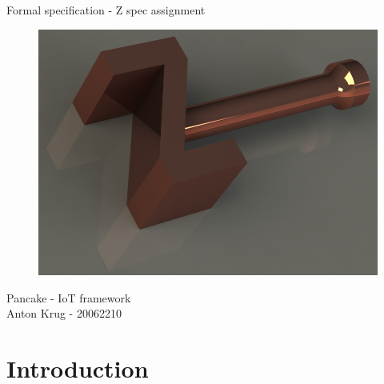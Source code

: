 \documentclass{article}
\begin{document}
\pagestyle{empty}

 
\center
{\Huge Formal specification -  Z spec assignment}

\begin{figure}[h!]
	\includegraphics[width=\textwidth]{images/hammer.png}
    \label{fig:modules}
\end{figure}

{\Huge Pancake - IoT framework }\\

{\huge Anton Krug - 20062210
\vfill
}







\newpage
\pagestyle{fancy}
\tableofcontents






\newpage
\section{Introduction}
\end{document}
